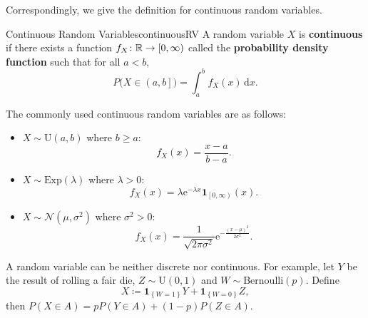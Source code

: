 \documentclass[math, code]{amznotes}
\theoremstyle{remark}
\newcommand{\e}{\mathrm{e}}
\renewcommand{\d}{\mathrm{d}}
\begin{document}
Correspondingly, we give the definition for continuous random variables.
\begin{dfnbox}{Continuous Random Variables}{continuousRV}
    A random variable $X$ is {\color{red} \textbf{continuous}} if there exists a function $f_X \colon \mathbb{R} \to \left[0, \infty\right)$ called the {\color{red} \textbf{probability density function}} such that for all $a < b$, 
    \begin{equation*}
        P\bigl(X \in \left(a, b\right]\bigr) = \int_{a}^{b}\!f_X\left(x\right)\,\d x.
    \end{equation*}
\end{dfnbox}
The commonly used continuous random variables are as follows:
\begin{itemize}
    \item $X \sim \mathrm{U}\left(a, b\right)$ where $b \geq a$:
    \begin{equation*}
        f_X\left(x\right) = \frac{x - a}{b - a}.
    \end{equation*}
    \item $X \sim \mathrm{Exp}\left(\lambda\right)$ where $\lambda > 0$:
    \begin{equation*}
        f_X\left(x\right) = \lambda \e^{-\lambda x}\mathbf{1}_{\left[0, \infty\right)}\left(x\right).
    \end{equation*}
    \item $X \sim \mathcal{N}\left(\mu, \sigma^2\right)$ where $\sigma^2 > 0$:
    \begin{equation*}
        f_X\left(x\right) = \frac{1}{\sqrt{2\pi\sigma^2}}\e^{-\frac{\left(x - \mu\right)^2}{2\sigma^2}}.
    \end{equation*}
\end{itemize}
A random variable can be neither discrete nor continuous. For example, let $Y$ be the result of rolling a fair die, $Z \sim \mathrm{U}\left(0, 1\right)$ and $W \sim \mathrm{Bernoulli}\left(p\right)$. Define 
\begin{equation*}
    X \coloneqq \mathbf{1}_{\left\{W = 1\right\}}Y + \mathbf{1}_{\left\{W = 0\right\}}Z,
\end{equation*}
then $P\left(X \in A\right) = pP\left(Y \in A\right) + \left(1 - p\right)P\left(Z \in A\right)$.
\end{document}
